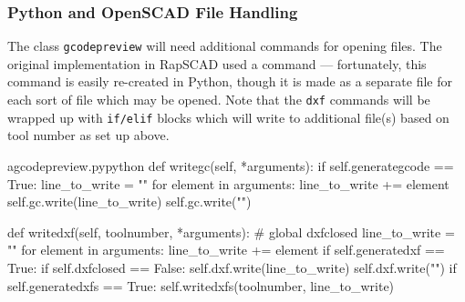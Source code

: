 \documentclass{ltxdoc}
\begin{document}
\subsubsection{Python and OpenSCAD File Handling}

The class \verb|gcodepreview| will need additional commands for opening files. The original implementation in {RapSCAD} used a command  --- fortunately, this command is easily re-created in Python, though it is made as a separate file for each sort of file which may be opened. Note that the \verb|dxf| commands will be wrapped up with \verb|if/elif| blocks which will write to additional file(s) based on tool number as set up above.

\lstset{firstnumber=\thegcpy}
\begin{writecode}{a}{gcodepreview.py}{python}
    def writegc(self, *arguments):
        if self.generategcode == True:
            line_to_write = ""
            for element in arguments:
                line_to_write += element
            self.gc.write(line_to_write)
            self.gc.write("\n")

    def writedxf(self, toolnumber, *arguments):
#        global dxfclosed
        line_to_write = ""
        for element in arguments:
            line_to_write += element
        if self.generatedxf == True:
            if self.dxfclosed == False:
                self.dxf.write(line_to_write)
                self.dxf.write("\n")
        if self.generatedxfs == True:
            self.writedxfs(toolnumber, line_to_write)


\end{writecode}
\end{document}

